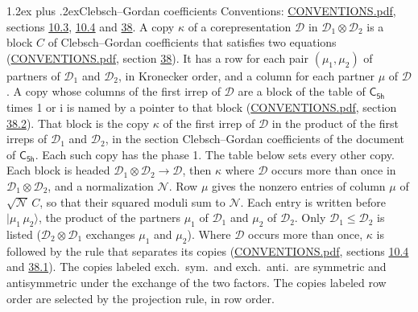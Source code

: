 \documentclass[10pt,a4paper]{article}
\makeatletter
\renewcommand\section{\@startsection{section}{1}{\z@}{-3ex plus -1ex minus -.2ex}%
  {1.2ex plus .2ex}{\normalfont\large\sffamily\bfseries\color{parttitle}}}
\numberwithin{equation}{section}
\newcommand{\grp}[1]{\mathsf{#1}}
\newcommand{\iunit}{\mathrm{i}}
\newcommand{\irrprod}{\otimes}
\newcommand{\mult}{\kappa}
\newcommand{\intx}{\mu}
\newcommand{\cgnorm}{\mathcal{N}}
\newcommand{\prodket}[2]{\lvert {#1}\,{#2}\rangle}
\makeatother
\begin{document}
\section{Clebsch--Gordan coefficients}\label{s:clebsch_gordan}
Conventions: \href{../../CONVENTIONS.pdf}{CONVENTIONS.pdf}, sections \href{../../../rotation/CONVENTIONS.pdf\#conv.10.3}{10.3}, \href{../../../rotation/CONVENTIONS.pdf\#conv.10.4}{10.4} and \href{../../CONVENTIONS.pdf\#conv.38}{38}.
\leavevmode\label{n:index.copy}\label{n:matrix.cg.stored}A copy $\mult$ of a corepresentation $\mathcal{D}$ in $\mathcal{D}_1\irrprod\mathcal{D}_2$ is a block $C$ of Clebsch--Gordan coefficients that satisfies two equations (\href{../../CONVENTIONS.pdf}{CONVENTIONS.pdf}, section \href{../../CONVENTIONS.pdf\#conv.38}{38}). \label{n:index.cg}It has a row for each pair $(\intx_1, \intx_2)$ of partners of $\mathcal{D}_1$ and $\mathcal{D}_2$, in Kronecker order, and a column for each partner $\intx$ of $\mathcal{D}$.
A copy whose columns of the first irrep of $\mathcal{D}$ are a block of the table of $\grp{C_{5h}}$ times 1 or $\iunit$ is named by a pointer to that block (\href{../../CONVENTIONS.pdf}{CONVENTIONS.pdf}, section \href{../../CONVENTIONS.pdf\#conv.38.2}{38.2}). That block is the copy $\mult$ of the first irrep of $\mathcal{D}$ in the product of the first irreps of $\mathcal{D}_1$ and $\mathcal{D}_2$, in the section Clebsch--Gordan coefficients of the document of \href{../../../rotation/data/pdf/C5h.pdf}{$\grp{C_{5h}}$}. Each such copy has the phase 1. The table below sets every other copy.
Each block is headed $\mathcal{D}_1\irrprod\mathcal{D}_2\to\mathcal{D}$, then $\mult$ where $\mathcal{D}$ occurs more than once in $\mathcal{D}_1\irrprod\mathcal{D}_2$, and a normalization $\cgnorm$. Row $\intx$ gives the nonzero entries of column $\intx$ of $\sqrt{\cgnorm}\,C$, so that their squared moduli sum to $\cgnorm$. \label{n:vector.ket.product}Each entry is written before $\prodket{\intx_1}{\intx_2}$, the product of the partners $\intx_1$ of $\mathcal{D}_1$ and $\intx_2$ of $\mathcal{D}_2$. Only $\mathcal{D}_1 \le \mathcal{D}_2$ is listed ($\mathcal{D}_2\irrprod\mathcal{D}_1$ exchanges $\intx_1$ and $\intx_2$).
Where $\mathcal{D}$ occurs more than once, $\mult$ is followed by the rule that separates its copies (\href{../../CONVENTIONS.pdf}{CONVENTIONS.pdf}, sections \href{../../../rotation/CONVENTIONS.pdf\#conv.10.4}{10.4} and \href{../../CONVENTIONS.pdf\#conv.38.1}{38.1}). \label{n:abbreviation.exchange}The copies labeled exch.\ sym.\ and exch.\ anti.\ are symmetric and antisymmetric under the exchange of the two factors. The copies labeled row order are selected by the projection rule, in row order.
\end{document}
